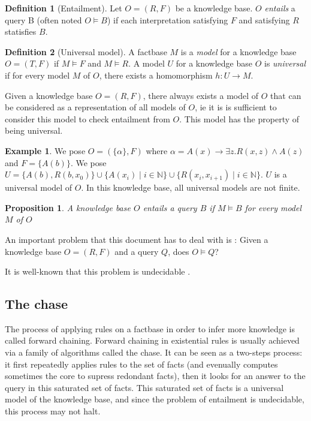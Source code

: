 \documentclass{article}
\newtheorem{proposition}{Proposition}[section]
\theoremstyle{definition}
\newtheorem{definition}{Definition}[section]
\newtheorem{example}{Example}[section]
\theoremstyle{remark}
\def \N {\mathbb N}
\begin{document}
\begin{definition}[Entailment]
Let $O=(R,F)$ be a knowledge base. $O$ \emph{entails} a query B (often noted $O \models B$) if each interpretation satisfying $F$ and satisfying $R$ statisfies $B$.
\end{definition}

\begin{definition}[Universal model]
A factbase $M$ is a \emph{model} for a knowledge base $O = (T,F)$ if $M \models F$ and $M \models R$.  A model $U$ for a knowledge base $O$ is \emph{universal} if for
every model $M$ of $O$, there exists a homomorphism $h : U \to M$.
\end{definition}

Given a knowledge base $O=(R,F)$, there always exists a model of $O$ that can be considered as a representation of all models of $O$, ie it is  is  sufficient  to  consider this model to check entailment from $O$. This model has the property of being universal.

\begin{example} We pose $O = (\{\alpha\},F)$ where $\alpha = A(x) \rightarrow \exists z.R(x,z) \wedge A(z)$ and $F = \{A(b)\}$. We pose $U = \{A(b),R(b,x_0)\}\cup \{A(x_i)\mid i \in \N\}\cup \{R(x_i,x_{i+1}) \mid i \in \N\}$. $U$ is a universal model of $O$. In this knowledge base, all universal models are not finite.
\end{example}

\begin{proposition}
A knowledge base $O$ entails a query $B$ if $M \models B$ for every model $M$ of $O$
\end{proposition}

An important problem that this document has to deal with is : Given a knowledge base $O=(R,F)$ and a query $Q$,  does $O \models Q$?

It  is  well-known  that  this  problem  is  undecidable .



\subsection{The chase}

The process of applying rules on a factbase in order to infer more knowledge is called forward chaining.   Forward  chaining  in  existential  rules  is  usually achieved  via  a  family  of  algorithms  called the  chase. It can be seen as a two-steps process: it first repeatedly applies rules to the set of facts (and evenually computes sometimes the core to supress redondant facts), then it looks for an answer to the query in this saturated set of facts. This saturated set of facts is a universal model of the knowledge base, and since the problem of entailment is undecidable, this process may not halt.
\end{document}
